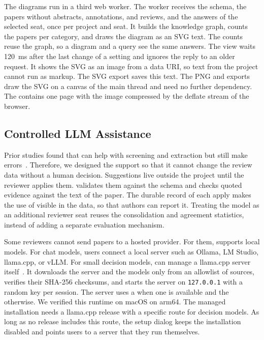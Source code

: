 The diagrams run in a third web worker.
The worker receives the schema, the papers without abstracts, annotations, and reviews, and the answers of the selected seat, once per project and seat.
It builds the knowledge graph, counts the papers per category, and draws the diagram as an SVG text.
The counts reuse the graph, so a diagram and a query see the same answers.
The view waits 120~ms after the last change of a setting and ignores the reply to an older request.
It shows the SVG as an image from a data URI, so text from the project cannot run as markup.
The SVG export saves this text.
The PNG and \PDF exports draw the SVG on a canvas of the main thread and need no further dependency.
The \PDF contains one page with the image compressed by the deflate stream of the browser.

\subsection{Controlled \acs{LLM} Assistance}\label{sec:architecture-llm}

Prior studies found that \LLMs can help with screening and extraction but still make errors~\cite{felizardo2024chatgpt,khraisha2024llm}.
Therefore, we designed the \LLM support so that it cannot change the review data without a human decision.
Suggestions live outside the project until the reviewer applies them.
\SaiLoR validates them against the schema and checks quoted evidence against the text of the paper.
The durable record of each apply makes the use of \LLMs visible in the data, so that authors can report it.
Treating the model as an additional reviewer seat reuses the consolidation and agreement statistics, instead of adding a separate evaluation mechanism.

Some reviewers cannot send papers to a hosted provider.
For them, \SaiLoR supports local models.
For chat models, users connect a local server such as Ollama, LM Studio, llama.cpp, or vLLM.
For small decision models, \SaiLoR can manage a llama.cpp server itself~\cite{llamacpp}.
It downloads the server and the models only from an allowlist of sources, verifies their SHA-256 checksums, and starts the server on \texttt{127.0.0.1} with a random key per session.
The server uses a \GPU when one is available and the \CPU otherwise.
We verified this runtime on macOS on arm64.
The managed installation needs a llama.cpp release with a specific route for decision models.
As long as no release includes this route, the setup dialog keeps the installation disabled and points users to a server that they run themselves.
